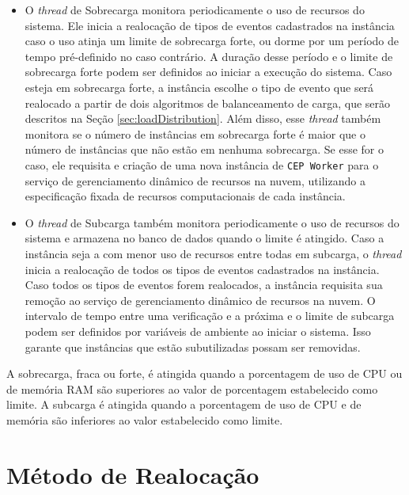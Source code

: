 \begin{itemize}

\item O \textit{thread} de Sobrecarga monitora periodicamente o uso de recursos do sistema. Ele inicia a realocação de tipos de eventos cadastrados na instância caso o uso atinja um limite de sobrecarga forte, ou dorme por um período de tempo pré-definido no caso contrário. A duração desse período e o limite de sobrecarga forte podem ser definidos ao iniciar a execução do sistema.
Caso esteja em sobrecarga forte, a instância escolhe o tipo de evento que será realocado a partir de dois algoritmos de balanceamento de carga, que serão descritos na Seção \ref{sec:loadDistribution}. Além disso, esse \textit{thread} também monitora se o número de instâncias em sobrecarga forte é maior que o número de instâncias que não estão em nenhuma sobrecarga. Se esse for o caso, ele requisita e criação de uma nova instância de \texttt{CEP Worker} para o serviço de gerenciamento dinâmico de recursos na nuvem, utilizando a especificação fixada de recursos computacionais de cada instância. 


\item O \textit{thread} de Subcarga também monitora periodicamente o uso de recursos do sistema e armazena no banco de dados quando o limite é atingido. Caso a instância seja a com menor uso de recursos entre todas em subcarga, o \textit{thread} inicia a realocação de todos os tipos de eventos cadastrados na instância. Caso todos os tipos de eventos forem realocados, a instância requisita sua remoção ao serviço de gerenciamento dinâmico de recursos na nuvem. O intervalo de tempo entre uma verificação e a próxima e o limite de subcarga podem ser definidos por variáveis de ambiente ao iniciar o sistema. Isso garante que instâncias que estão subutilizadas possam ser removidas.
  
\end{itemize}

A sobrecarga, fraca ou forte, é atingida quando a porcentagem de uso de CPU ou de memória RAM são superiores ao valor de porcentagem estabelecido como limite. A subcarga é atingida quando a porcentagem de uso de CPU e de memória são inferiores ao valor estabelecido como limite. 


\section{Método de Realocação}

